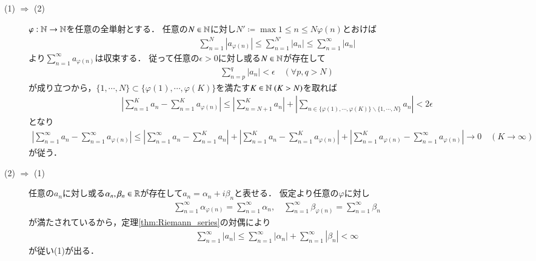 	\begin{prf}\mbox{}
		\begin{description}
			\item[(1) $\Rightarrow$ (2)]
				$\varphi:\mathbb{N} \rightarrow \mathbb{N}$を任意の全単射とする．
				任意の$N \in \mathbb{N}$に対し$N' \coloneqq \max{1 \leq n \leq N}{\varphi(n)}$とおけば
				\begin{align}
					\sum_{n=1}^{N} \left| a_{\varphi(n)} \right|
					\leq \sum_{n=1}^{N'} \left| a_n \right|
					\leq \sum_{n=1}^{\infty} \left| a_n \right|
				\end{align}
				より$\sum_{n=1}^{\infty} a_{\varphi(n)}$は収束する．
				従って任意の$\epsilon > 0$に対し或る$N \in \mathbb{N}$が存在して
				\begin{align}
					\sum_{n=p}^{q} |a_n| < \epsilon
					\quad (\forall p,q > N)
				\end{align}
				が成り立つから，$\{1,\cdots,N\} \subset \{\varphi(1),\cdots,\varphi(K)\}$を満たす$K \in \mathbb{N}\ (K > N)$を取れば
				\begin{align}
					\left| \sum_{n=1}^{K} a_n - \sum_{n=1}^{K} a_{\varphi(n)} \right|
					\leq \left| \sum_{n=N+1}^K a_n \right| + \left| \sum_{n \in \{\varphi(1),\cdots,\varphi(K)\} \backslash \{1,\cdots,N\}} a_n \right|
					< 2 \epsilon
				\end{align}
				となり
				\begin{align}
					\left| \sum_{n=1}^{\infty} a_n - \sum_{n=1}^{\infty} a_{\varphi(n)} \right|
					\leq \left| \sum_{n=1}^{\infty} a_n - \sum_{n=1}^{K} a_n \right|
						+ \left| \sum_{n=1}^{K} a_n - \sum_{n=1}^{K} a_{\varphi(n)} \right|
						+ \left| \sum_{n=1}^{K} a_{\varphi(n)} - \sum_{n=1}^{\infty} a_{\varphi(n)} \right|
					\longrightarrow 0
					\quad (K \longrightarrow \infty)
				\end{align}
				が従う．
				
			\item[(2) $\Rightarrow$ (1)]
				任意の$a_n$に対し或る$\alpha_n,\beta_n \in \mathbb{R}$が存在して$a_n = \alpha_n + i \beta_n$と表せる．
				仮定より任意の$\varphi$に対し
				\begin{align}
					\sum_{n=1}^{\infty} \alpha_{\varphi(n)} = \sum_{n=1}^{\infty} \alpha_n,
					\quad \sum_{n=1}^{\infty} \beta_{\varphi(n)} = \sum_{n=1}^{\infty} \beta_n
				\end{align}
				が満たされているから，定理\ref{thm:Riemann_series}の対偶により
				\begin{align}
					\sum_{n=1}^\infty |a_n| \leq \sum_{n=1}^{\infty} |\alpha_n| + \sum_{n=1}^{\infty} |\beta_n| < \infty
				\end{align}
				が従い(1)が出る．
				\QED
				
		\end{description}
	\end{prf}